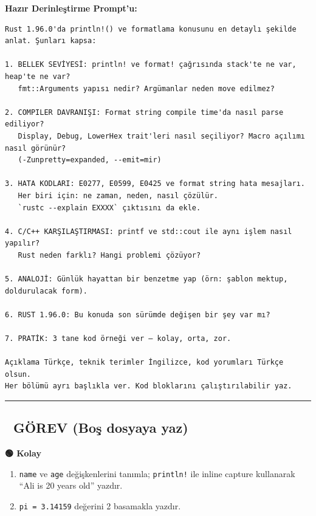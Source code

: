 \documentclass[12pt,a4paper]{article}
\begin{document}
\textbf{Hazır Derinleştirme Prompt'u:}

\begin{verbatim}
Rust 1.96.0'da println!() ve formatlama konusunu en detaylı şekilde anlat. Şunları kapsa:

1. BELLEK SEVİYESİ: println! ve format! çağrısında stack'te ne var, heap'te ne var?
   fmt::Arguments yapısı nedir? Argümanlar neden move edilmez?

2. COMPILER DAVRANIŞI: Format string compile time'da nasıl parse ediliyor?
   Display, Debug, LowerHex trait'leri nasıl seçiliyor? Macro açılımı nasıl görünür?
   (-Zunpretty=expanded, --emit=mir)

3. HATA KODLARI: E0277, E0599, E0425 ve format string hata mesajları.
   Her biri için: ne zaman, neden, nasıl çözülür.
   `rustc --explain EXXXX` çıktısını da ekle.

4. C/C++ KARŞILAŞTIRMASI: printf ve std::cout ile aynı işlem nasıl yapılır?
   Rust neden farklı? Hangi problemi çözüyor?

5. ANALOJİ: Günlük hayattan bir benzetme yap (örn: şablon mektup, doldurulacak form).

6. RUST 1.96.0: Bu konuda son sürümde değişen bir şey var mı?

7. PRATİK: 3 tane kod örneği ver — kolay, orta, zor.

Açıklama Türkçe, teknik terimler İngilizce, kod yorumları Türkçe olsun.
Her bölümü ayrı başlıkla ver. Kod bloklarını çalıştırılabilir yaz.
\end{verbatim}

\begin{center}\rule{0.5\linewidth}{0.5pt}\end{center}

\subsection{📝 GÖREV (Boş dosyaya yaz)}\label{görev-boş-dosyaya-yaz}

\textbf{🟢 Kolay}

\begin{enumerate}
\def\labelenumi{\arabic{enumi}.}
\tightlist
\item
  \texttt{name} ve \texttt{age} değişkenlerini tanımla; \texttt{println!} ile inline capture kullanarak ``Ali is 20 years old'' yazdır.
\item
  \texttt{pi\ =\ 3.14159} değerini 2 basamakla yazdır.
\end{enumerate}
\end{document}
